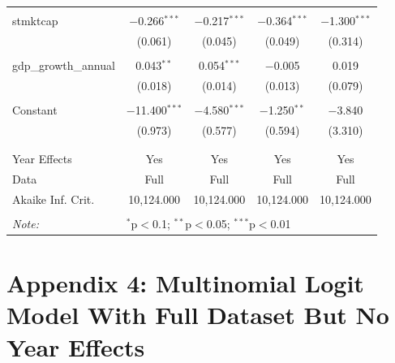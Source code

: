 \documentclass[a4paper,nobind]{templates/ociamthesis}
\begin{document}
\begin{table}[!htbp]
\begin{tabular}{@{\extracolsep{5pt}}lcccc}
  & & & & \\ 
 stmktcap & $-$0.266$^{***}$ & $-$0.217$^{***}$ & $-$0.364$^{***}$ & $-$1.300$^{***}$ \\ 
  & (0.061) & (0.045) & (0.049) & (0.314) \\ 
  & & & & \\ 
 gdp\_growth\_annual & 0.043$^{**}$ & 0.054$^{***}$ & $-$0.005 & 0.019 \\ 
  & (0.018) & (0.014) & (0.013) & (0.079) \\ 
  & & & & \\ 
 Constant & $-$11.400$^{***}$ & $-$4.580$^{***}$ & $-$1.250$^{**}$ & $-$3.840 \\ 
  & (0.973) & (0.577) & (0.594) & (3.310) \\ 
  & & & & \\ 
\hline \\[-1.8ex] 
Year Effects & Yes & Yes & Yes & Yes \\ 
Data & Full & Full & Full & Full \\ 
Akaike Inf. Crit. & 10,124.000 & 10,124.000 & 10,124.000 & 10,124.000 \\ 
\hline 
\hline \\[-1.8ex] 
\textit{Note:}  & \multicolumn{4}{l}{$^{*}$p$<$0.1; $^{**}$p$<$0.05; $^{***}$p$<$0.01} \\ 
\end{tabular} 
\end{table}

\newpage

\hypertarget{appendix-4-multinomial-logit-model-with-full-dataset-but-no-year-effects}{%
\section{Appendix 4: Multinomial Logit Model With Full Dataset But No Year Effects}\label{appendix-4-multinomial-logit-model-with-full-dataset-but-no-year-effects}}
\end{document}
